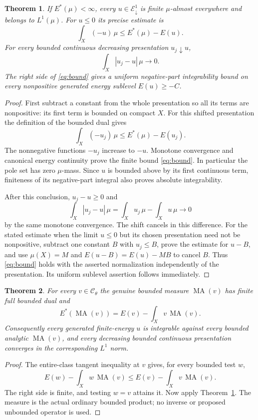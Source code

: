 \documentclass[11pt]{article}
\newtheorem{theorem}{Theorem}
\newcommand{\MA}{\operatorname{MA}}
\begin{document}
\begin{theorem}\label{thm:integrability}
If $E^*(\mu)<\infty$, every $u\in\mathcal E^1_{\downarrow}$ is
finite $\mu$-almost everywhere and belongs to $L^1(\mu)$. For
$u\leq0$ its precise estimate is
\begin{equation}\label{eq:bound}
                         \int_X(-u)\,\mu\leq E^*(\mu)-E(u).
\end{equation}
For every bounded continuous decreasing presentation $u_j\downarrow u$,
\[
                   \int_X|u_j-u|\,\mu\longrightarrow0.
\]
The right side of \eqref{eq:bound} gives a uniform negative-part
integrability bound on every nonpositive generated energy sublevel
$E(u)\geq-C$.
\end{theorem}
\begin{proof}
First subtract a constant from the whole presentation so all its terms
are nonpositive: its first term is bounded on compact $X$. For this
shifted presentation the definition of the bounded dual gives
\[
                    \int_X(-u_j)\,\mu\leq E^*(\mu)-E(u_j).
\]
The nonnegative functions $-u_j$ increase to $-u$. Monotone
convergence and canonical energy continuity prove the finite bound
\eqref{eq:bound}. In particular the pole set has zero $\mu$-mass.
Since $u$ is bounded above by its first continuous term, finiteness
of its negative-part integral also proves absolute integrability.

After this conclusion, $u_j-u\geq0$ and
\[
 \int_X|u_j-u|\,\mu=\int_Xu_j\,\mu-\int_Xu\,\mu\longrightarrow0
\]
by the same monotone convergence. The shift cancels in this difference.
For the stated estimate when the limit $u\leq0$ but its chosen
presentation need not be nonpositive, subtract one constant $B$ with
$u_j\leq B$, prove the estimate for $u-B$, and use
$\mu(X)=M$ and $E(u-B)=E(u)-MB$ to cancel $B$. Thus
\eqref{eq:bound} holds with the asserted normalization independently
of the presentation. Its uniform sublevel assertion follows immediately.
\end{proof}

\begin{theorem}\label{thm:bounded-measures}
For every $v\in\mathcal C_\theta$ the genuine bounded measure
$\MA(v)$ has finite full bounded dual and
\[
                      E^*(\MA(v))=E(v)-\int_Xv\,\MA(v).
\]
Consequently every generated finite-energy $u$ is integrable against
every bounded analytic $\MA(v)$, and every decreasing bounded
continuous presentation converges in the corresponding $L^1$ norm.
\end{theorem}
\begin{proof}
The entire-class tangent inequality at $v$ gives, for every bounded
test $w$,
\[
 E(w)-\int_Xw\,\MA(v)\leq E(v)-\int_Xv\,\MA(v).
\]
The right side is finite, and testing $w=v$ attains it. Now apply
Theorem~\ref{thm:integrability}. The measure is the actual ordinary
bounded product; no inverse or proposed unbounded operator is used.
\end{proof}
\end{document}
